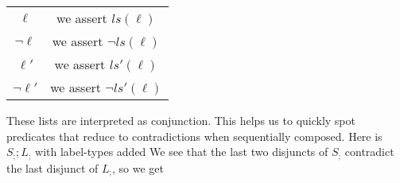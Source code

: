 \begin{tabular}{|c|c|}
  \hline
  $\ell$ & we assert $ls(\ell)$ \\
  $\lnot\ell$ & we assert $\lnot ls(\ell)$ \\
  $\ell'$ & we assert $ls'(\ell)$ \\
  $\lnot\ell'$ & we assert $\lnot ls'(\ell)$ \\
  \hline
\end{tabular}

These lists are interpreted as conjunction.
This helps us to quickly spot predicates that reduce to 
contradictions when sequentially composed.
Here is $S_; ; L_;$ with label-types added
We see that the last two disjuncts of $S_;$ contradict the last disjunct
of $L_;$, so we get
